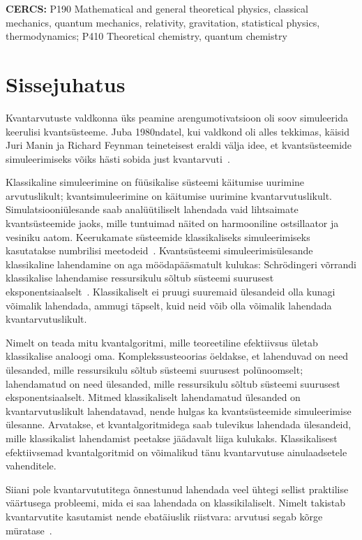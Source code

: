 \documentclass[12pt]{report}
\begin{document}
\noindent\textbf{CERCS:}
P190 Mathematical and general theoretical physics, classical mechanics, quantum
mechanics, relativity, gravitation, statistical physics, thermodynamics; P410 Theoretical chemistry, quantum chemistry

\tableofcontents

\chapter{Sissejuhatus}

Kvantarvutuste valdkonna üks peamine arengumotivatsioon oli soov simuleerida keerulisi kvantsüsteeme.
Juba 1980ndatel, kui valdkond oli alles tekkimas, käisid Juri Manin ja Richard Feynman teineteisest eraldi välja idee, et kvantsüsteemide simuleerimiseks võiks hästi sobida just kvantarvuti~\cite{manin, feynman}.

Klassikaline simuleerimine on füüsikalise süsteemi käitumise uurimine arvutuslikult; kvantsimuleerimine on käitumise uurimine kvantarvutuslikult.
Simulatsiooniülesande saab analüütiliselt lahendada vaid lihtsaimate kvantsüsteemide jaoks, mille tuntuimad näited on harmooniline ostsillaator ja vesiniku aatom.
Keerukamate süsteemide klassikaliseks simuleerimiseks kasutatakse numbrilisi meetodeid~\cite{szabo+ostlund, whitfield+etal2011}.
Kvantsüsteemi simuleerimisülesande klassikaline lahendamine on aga möödapääsmatult kulukas: Schrödingeri võrrandi klassikalise lahendamise ressursikulu sõltub süsteemi suurusest eksponentsiaalselt~\cite{whitfield+etal2011, mcardle+etal, cao+etal, kassal+etal}.
Klassikaliselt ei pruugi suuremaid ülesandeid olla kunagi võimalik lahendada, ammugi täpselt, kuid neid võib olla võimalik lahendada kvantarvutuslikult.

Nimelt on teada mitu kvantalgoritmi, mille teoreetiline efektiivsus ületab klassikalise analoogi oma.
Komplekssusteoorias öeldakse, et lahenduvad on need ülesanded, mille ressursikulu sõltub süsteemi suurusest polünoomselt; lahendamatud on need ülesanded, mille ressursikulu sõltub süsteemi suurusest eksponentsiaalselt.
Mitmed klassikaliselt lahendamatud ülesanded on kvantarvutuslikult lahendatavad, nende hulgas ka kvantsüsteemide simuleerimise ülesanne.
Arvatakse, et kvantalgoritmidega saab tulevikus lahendada ülesandeid, mille klassikalist lahendamist peetakse jäädavalt liiga kulukaks.
Klassikalisest efektiivsemad kvantalgoritmid on võimalikud tänu kvantarvutuse ainulaadsetele vahenditele.

Siiani pole kvantarvututitega õnnestunud lahendada veel ühtegi sellist praktilise väärtusega probleemi, mida ei saa lahendada on klassikilaliselt.
Nimelt takistab kvantarvutite kasutamist nende ebatäiuslik riistvara: arvutusi segab kõrge müratase~\cite{whitfield+etal2022}.
\end{document}
